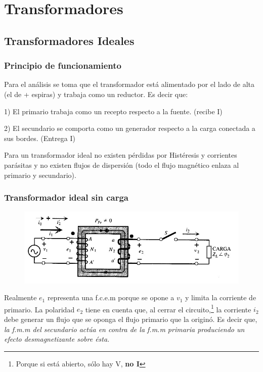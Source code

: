 \section{Transformadores}

\subsection{Transformadores Ideales}
\subsubsection{Principio de funcionamiento}
Para el análisis se toma que el transformador está alimentado por el lado de alta (el de + espiras) y trabaja como un reductor. Es decir que:

1) El primario trabaja como un recepto respecto a la fuente. (recibe I)

2) El secundario se comporta como un generador respecto a la carga conectada a sus bordes. (Entrega I)

Para un transformador ideal no existen pérdidas por Histéresis y corrientes parásitas y no existen flujos de dispersión (todo el flujo magnético enlaza al primario y secundario).

\subsubsection{Transformador ideal sin carga}
\begin{figure}[!htbp]
	\centering
	\includegraphics[width=0.80\linewidth]{"../Figuras/1"}
\end{figure} 
 
 Realmente $e_{1}$ representa una f.c.e.m porque se opone a $v_{1}$ y limita la corriente de primario. La polaridad $e_{2}$ tiene en cuenta que, al cerrar el circuito,\footnote{Porque si está abierto, sólo hay V, \textbf{no I}} la corriente $i_{2}$ debe generar un flujo que se oponga el flujo primario que la originó. Es decir que, \textit{la f.m.m del secundario actúa en contra de la f.m.m primaria produciendo un efecto desmagnetizante sobre ésta.}
 
